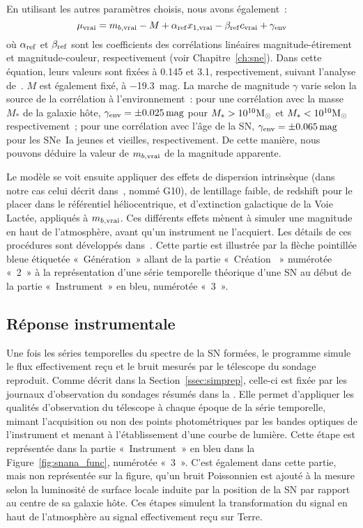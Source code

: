 \documentclass[../main/main.tex]{subfiles}
\begin{document}
En utilisant les autres paramètres choisis, nous avons également~:
\begin{equation}\label{eq:mutrue}
    \mu_{\rm vrai} = m_{b, \rm vrai} - M + \alpha_{\rm ref} x_{1, \rm vrai} -
    \beta_{\rm ref} c_{\rm vrai}+ \gamma_{\rm env}
\end{equation}
où $\alpha_{\rm ref}$ et $\beta_{\rm ref}$ sont les coefficients des
corrélations linéaires magnitude-étirement et magnitude-couleur, respectivement
(voir Chapitre~\ref{ch:sne}). Dans cette équation, leurs valeurs sont fixées à
\num{0.145} et \num{3.1}, respectivement, suivant l'analyse
de~\cite{popovic2021a}. $M$ est également fixé, à \SI{-19.3}{mag}. La marche de
magnitude $\gamma$ varie selon la source de la corrélation à l'environnement~:
pour une corrélation avec la masse $M_*$ de la galaxie hôte, $\gamma_{\rm env} =
\pm \SI{0.025}{mag}$ pour $M_* > 10^{10}\si{\Msun}$ et $M_* < 10^{10}\si{\Msun}$
respectivement~; pour une corrélation avec l'âge de la SN, $\gamma_{\rm env} =
\pm \SI{0.065}{mag}$ pour les SNe~Ia jeunes et vieilles, respectivement. De
cette manière, nous pouvons déduire la valeur de $m_{b, \rm vrai}$ de la
magnitude apparente.

Le modèle se voit ensuite appliquer des effets de dispersion intrinsèque (dans
notre cas celui décrit dans~\cite{guy2010}, nommé G10), de lentillage faible, de
redshift pour le placer dans le référentiel héliocentrique, et d'extinction
galactique de la Voie Lactée, appliqués à $m_{b, \rm vrai}$. Ces différents
effets mènent à simuler une magnitude en haut de l'atmosphère, avant qu'un
instrument ne l'acquiert. Les détails de ces procédures sont développés
dans~\cite{kessler2019}. Cette partie est illustrée par la flèche pointillée
bleue étiquetée «~Génération~» allant de la partie «~Création \hostlib~»
numérotée «~2~» à la représentation d'une série temporelle théorique d'une SN au
début de la partie «~Instrument~» en bleu, numérotée «~3~».

\subsection{Réponse instrumentale}\label{ssec:siminst}

Une fois les séries temporelles du spectre de la SN formées, le programme simule
le flux effectivement reçu et le bruit mesurés par le télescope du sondage
reproduit. Comme décrit dans la Section~\ref{ssec:simprep}, celle-ci est fixée
par les journaux d'observation du sondages résumés dans la \simlib. Elle permet
d'appliquer les qualités d'observation du télescope à chaque époque de la série
temporelle, mimant l'acquisition ou non des points photométriques par les bandes
optiques de l'instrument et menant à l'établissement d'une courbe de lumière.
Cette étape est représentée dans la partie «~Instrument~» en bleu dans la
Figure~\ref{fig:snana_func}, numérotée «~3~». C'est également dans cette partie,
mais non représentée sur la figure, qu'un bruit Poissonnien est ajouté à la
mesure selon la luminosité de surface locale induite par la position de la SN
par rapport au centre de sa galaxie hôte. Ces étapes simulent la transformation
du signal en haut de l'atmosphère au signal effectivement reçu sur Terre.
\end{document}
